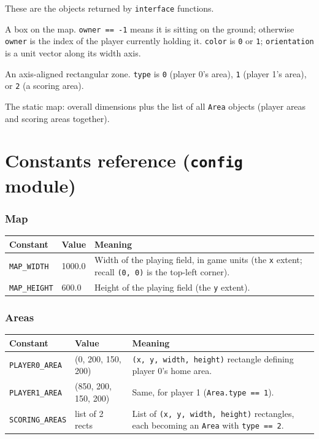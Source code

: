 \documentclass[11pt,a4paper]{article}
\newcommand{\code}[1]{\texttt{#1}}
\begin{document}
These are the objects returned by \code{interface} functions.

\begin{description}[leftmargin=2.4cm,style=nextline]
    \item[\code{Box(id, position, orientation, color, owner)}]
        A box on the map. \code{owner == -1} means it is sitting on the
        ground; otherwise \code{owner} is the index of the player currently
        holding it.
        \code{color} is \code{0} or \code{1}; \code{orientation} is a unit
        vector along its width axis.
    \item[\code{Area(id, type, x, y, width, height)}]
        An axis-aligned rectangular zone. \code{type} is \code{0}
        (player 0's area), \code{1} (player 1's area), or \code{2}
        (a scoring area).
    \item[\code{Map(width, height, areas)}]
        The static map: overall dimensions plus the list of all
        \code{Area} objects (player areas and scoring areas together).
\end{description}

\section{Constants reference (\code{config} module)}

\subsubsection*{Map}
\begin{longtable}{p{4.7cm}p{2cm}p{8cm}}
\toprule
\textbf{Constant} & \textbf{Value} & \textbf{Meaning} \\
\midrule
\endhead
\code{MAP\_WIDTH} & 1000.0 & Width of the playing field, in game units (the
    \code{x} extent; recall \code{(0, 0)} is the top-left corner). \\
\code{MAP\_HEIGHT} & 600.0 & Height of the playing field (the \code{y}
    extent). \\
\bottomrule
\end{longtable}

\subsubsection*{Areas}
\begin{longtable}{p{4.7cm}p{2cm}p{8cm}}
\toprule
\textbf{Constant} & \textbf{Value} & \textbf{Meaning} \\
\midrule
\endhead
\code{PLAYER0\_AREA} & \scriptsize(0, 200, 150, 200) & \code{(x, y, width,
    height)} rectangle defining player 0's home area. \\
\code{PLAYER1\_AREA} & \scriptsize(850, 200, 150, 200) & Same, for player 1
    (\code{Area.type == 1}). \\
\code{SCORING\_AREAS} & \scriptsize list of 2 rects & List of \code{(x, y,
    width, height)} rectangles, each becoming an \code{Area} with
    \code{type == 2}. \\
\bottomrule
\end{longtable}
\end{document}
